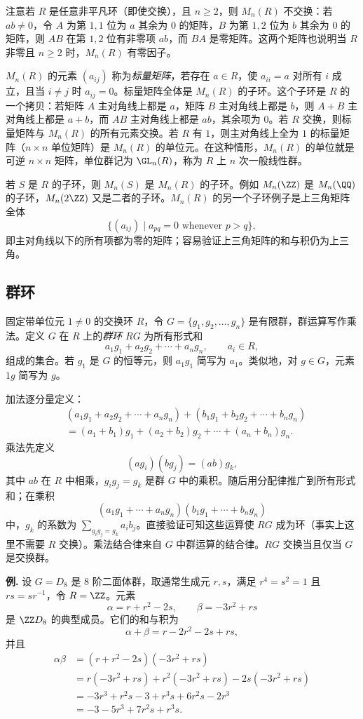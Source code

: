 注意若 $R$ 是任意非平凡环（即使交换），且 $n\geq2$，则 $M_n(R)$ 不交换：若 $ab\neq0$，令 $A$ 为第 $1,1$ 位为 $a$ 其余为 $0$ 的矩阵，$B$ 为第 $1,2$ 位为 $b$ 其余为 $0$ 的矩阵，则 $AB$ 在第 $1,2$ 位有非零项 $ab$，而 $BA$ 是零矩阵。这两个矩阵也说明当 $R$ 非零且 $n\geq2$ 时，$M_n(R)$ 有零因子。

$M_n(R)$ 的元素 $(a_{ij})$ 称为\emph{标量矩阵}，若存在 $a\in R$，使 $a_{ii}=a$ 对所有 $i$ 成立，且当 $i\neq j$ 时 $a_{ij}=0$。标量矩阵全体是 $M_n(R)$ 的子环。这个子环是 $R$ 的一个拷贝：若矩阵 $A$ 主对角线上都是 $a$，矩阵 $B$ 主对角线上都是 $b$，则 $A+B$ 主对角线上都是 $a+b$，而 $AB$ 主对角线上都是 $ab$，其余项为 $0$。若 $R$ 交换，则标量矩阵与 $M_n(R)$ 的所有元素交换。若 $R$ 有 $1$，则主对角线上全为 $1$ 的标量矩阵（$n\times n$ 单位矩阵）是 $M_n(R)$ 的单位元。在这种情形，$M_n(R)$ 的单位就是可逆 $n\times n$ 矩阵，单位群记为 $\GL_n(R)$，称为 $R$ 上 $n$ 次一般线性群。

若 $S$ 是 $R$ 的子环，则 $M_n(S)$ 是 $M_n(R)$ 的子环。例如 $M_n(\ZZ)$ 是 $M_n(\QQ)$ 的子环，$M_n(2\ZZ)$ 又是二者的子环。$M_n(R)$ 的另一个子环例子是上三角矩阵全体
\[
  \{(a_{ij})\mid a_{pq}=0\text{ whenever }p>q\},
\]
即主对角线以下的所有项都为零的矩阵；容易验证上三角矩阵的和与积仍为上三角。

\subsection*{群环}
固定带单位元 $1\neq0$ 的交换环 $R$，令 $G=\{g_1,g_2,\ldots,g_n\}$ 是有限群，群运算写作乘法。定义 $G$ 在 $R$ 上的\emph{群环} $RG$ 为所有形式和
\[
  a_1g_1+a_2g_2+\cdots+a_ng_n,
  \qquad a_i\in R,
\]
组成的集合。若 $g_1$ 是 $G$ 的恒等元，则 $a_1g_1$ 简写为 $a_1$。类似地，对 $g\in G$，元素 $1g$ 简写为 $g$。

加法逐分量定义：
\[
\begin{aligned}
&(a_1g_1+a_2g_2+\cdots+a_ng_n)+(b_1g_1+b_2g_2+\cdots+b_ng_n)\\
&=(a_1+b_1)g_1+(a_2+b_2)g_2+\cdots+(a_n+b_n)g_n.
\end{aligned}
\]
乘法先定义
\[
  (ag_i)(bg_j)=(ab)g_k,
\]
其中 $ab$ 在 $R$ 中相乘，$g_ig_j=g_k$ 是群 $G$ 中的乘积。随后用分配律推广到所有形式和；在乘积
\[
(a_1g_1+\cdots+a_ng_n)(b_1g_1+\cdots+b_ng_n)
\]
中，$g_k$ 的系数为 $\sum_{g_ig_j=g_k}a_ib_j$。直接验证可知这些运算使 $RG$ 成为环（事实上这里不需要 $R$ 交换）。乘法结合律来自 $G$ 中群运算的结合律。$RG$ 交换当且仅当 $G$ 是交换群。

\medskip
\noindent\textbf{例.}
设 $G=D_8$ 是 $8$ 阶二面体群，取通常生成元 $r,s$，满足 $r^4=s^2=1$ 且 $rs=sr^{-1}$，令 $R=\ZZ$。元素
\[
  \alpha=r+r^2-2s,
  \qquad \beta=-3r^2+rs
\]
是 $\ZZ D_8$ 的典型成员。它们的和与积为
\[
  \alpha+\beta=r-2r^2-2s+rs,
\]
并且
\[
\begin{aligned}
\alpha\beta&=(r+r^2-2s)(-3r^2+rs)\\
&=r(-3r^2+rs)+r^2(-3r^2+rs)-2s(-3r^2+rs)\\
&=-3r^3+r^2s-3+r^3s+6r^2s-2r^3\\
&=-3-5r^3+7r^2s+r^3s.
\end{aligned}
\]

